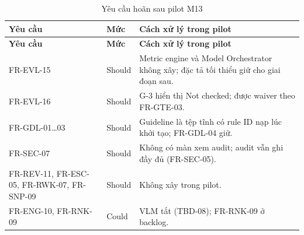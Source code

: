 \begin{xltabular}{\linewidth}{@{}L{3.6cm}L{1.6cm}Y@{}}
\caption{Yêu cầu hoãn sau pilot M13}\label{tab:pilot-deferred}\\
\toprule
\textbf{Yêu cầu} & \textbf{Mức} & \textbf{Cách xử lý trong pilot}\\
\midrule
\endfirsthead
\toprule \textbf{Yêu cầu} & \textbf{Mức} & \textbf{Cách xử lý trong pilot}\\ \midrule
\endhead
\bottomrule
\endfoot
FR-EVL-15 & Should & Metric engine và Model Orchestrator không xây; đặc tả tối thiểu giữ cho giai đoạn sau.\\
FR-EVL-16 & Should & G-3 hiển thị Not checked; được waiver theo FR-GTE-03.\\
FR-GDL-01…03 & Should & Guideline là tệp tĩnh có rule ID nạp lúc khởi tạo; FR-GDL-04 giữ.\\
FR-SEC-07 & Should & Không có màn xem audit; audit vẫn ghi đầy đủ (FR-SEC-05).\\
FR-REV-11, FR-ESC-05, FR-RWK-07, FR-SNP-09 & Should & Không xây trong pilot.\\
FR-ENG-10, FR-RNK-09 & Could & VLM tắt (TBD-08); FR-RNK-09 ở backlog.\\
\end{xltabular}

